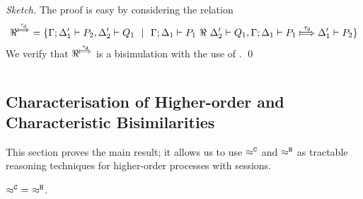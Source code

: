 \begin{proof}[Sketch]
	The proof is easy by considering the relation
	\[
		\Re^{\Hby{\dtau}} = \set{ \horel{\Gamma}{\Delta_1'}{P_2}{,}{\Delta_2'}{Q_1} \setbar \horel{\Gamma}{\Delta_1}{P_1}{\ \Re\ }{\Delta_2'}{Q_1},
		\horel{\Gamma}{\Delta_1}{P_1}{\Hby{\dtau}}{\Delta_1'}{P_2} }
	\]
	We verify that $\Re^{\Hby{\dtau}}$ is a bisimulation with
	the use of .
	\qed
\end{proof}

\[
\]



\subsection{Characterisation of Higher-order and Characteristic Bisimilarities}
\label{ss:charact}

This section proves the main result; %
it allows us to use $\approx^\mathtt{C}$ and $\approx^\mathtt{H}$   as tractable reasoning
techniques for higher-order processes with sessions.


\begin{lemma}
	\label{lem:wb_eq_wbf}
	$\approx^\mathtt{C}\ =\ \approx^\mathtt{H}$.
\end{lemma}

